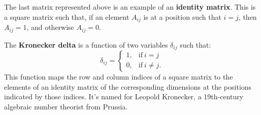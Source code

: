 \documentclass[12pt]{article}
\begin{document}
\begin{defn}
  The last matrix represented above is an example of an
  \textbf{identity matrix}. This is a square matrix such that, if
  an element $A_{ij}$ is at a position such that $i = j$, then
  $A_{ij} = 1$, and otherwise $A_{ij} = 0$.
\end{defn}

\begin{defn}
  The \textbf{Kronecker delta} is a function of two variables
  $\delta_{ij}$ such that:
  \begin{equation*}
    \delta_{ij} =
      \begin{cases}
        1, & \text{if}\ i = j \\
        0, & \text{if}\ i \neq j.
      \end{cases}
  \end{equation*}
  This function maps the row and column indices of a square
  matrix to the elements of an identity matrix of the
  corresponding dimensions at the positions indicated by those
  indices. It's named for Leopold Kronecker, a 19th-century
  algebraic number theorist from Prussia.
\end{defn}
\end{document}
